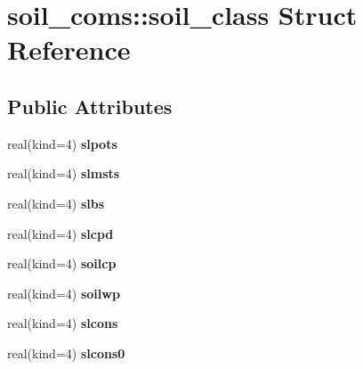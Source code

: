 \hypertarget{structsoil__coms_1_1soil__class}{
\section{soil\_\-coms::soil\_\-class Struct Reference}
\label{structsoil__coms_1_1soil__class}
}
\subsection*{Public Attributes}
\begin{DoxyCompactItemize}
\item 
\hypertarget{structsoil__coms_1_1soil__class_abfc4e2446c304449858363b094e2344d}{
real(kind=4) {\bfseries slpots}}
\label{structsoil__coms_1_1soil__class_abfc4e2446c304449858363b094e2344d}

\item 
\hypertarget{structsoil__coms_1_1soil__class_a56f2701c2652957a05492b9d1291796f}{
real(kind=4) {\bfseries slmsts}}
\label{structsoil__coms_1_1soil__class_a56f2701c2652957a05492b9d1291796f}

\item 
\hypertarget{structsoil__coms_1_1soil__class_a1bcc476131afca1213f8fc38876ed266}{
real(kind=4) {\bfseries slbs}}
\label{structsoil__coms_1_1soil__class_a1bcc476131afca1213f8fc38876ed266}

\item 
\hypertarget{structsoil__coms_1_1soil__class_ab17bdd369f299563eb109466cf3b4599}{
real(kind=4) {\bfseries slcpd}}
\label{structsoil__coms_1_1soil__class_ab17bdd369f299563eb109466cf3b4599}

\item 
\hypertarget{structsoil__coms_1_1soil__class_ac8d254f86a3686ef8a48a473931020e3}{
real(kind=4) {\bfseries soilcp}}
\label{structsoil__coms_1_1soil__class_ac8d254f86a3686ef8a48a473931020e3}

\item 
\hypertarget{structsoil__coms_1_1soil__class_a417d48eb2c1c9d9c678c9225985a68d6}{
real(kind=4) {\bfseries soilwp}}
\label{structsoil__coms_1_1soil__class_a417d48eb2c1c9d9c678c9225985a68d6}

\item 
\hypertarget{structsoil__coms_1_1soil__class_a76abb6daef7e23e97b4dd12937c54f58}{
real(kind=4) {\bfseries slcons}}
\label{structsoil__coms_1_1soil__class_a76abb6daef7e23e97b4dd12937c54f58}

\item 
\hypertarget{structsoil__coms_1_1soil__class_a9172c6cc1989a009ae5a6dd762e9166b}{
real(kind=4) {\bfseries slcons0}}
\label{structsoil__coms_1_1soil__class_a9172c6cc1989a009ae5a6dd762e9166b}


\end{DoxyCompactItemize}
